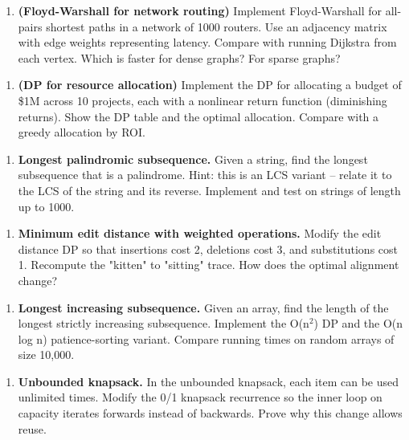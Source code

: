 \begin{enumerate}
\item \textbf{(Floyd-Warshall for network routing)} Implement Floyd-Warshall for all-pairs shortest paths in a network of 1000 routers. Use an adjacency matrix with edge weights representing latency. Compare with running Dijkstra from each vertex. Which is faster for dense graphs? For sparse graphs?
\end{enumerate}

\begin{enumerate}
\item \textbf{(DP for resource allocation)} Implement the DP for allocating a budget of \$1M across 10 projects, each with a nonlinear return function (diminishing returns). Show the DP table and the optimal allocation. Compare with a greedy allocation by ROI.
\end{enumerate}

\begin{enumerate}
\item \textbf{Longest palindromic subsequence.} Given a string, find the longest subsequence that is a palindrome. Hint: this is an LCS variant -- relate it to the LCS of the string and its reverse. Implement and test on strings of length up to 1000.
\end{enumerate}

\begin{enumerate}
\item \textbf{Minimum edit distance with weighted operations.} Modify the edit distance DP so that insertions cost 2, deletions cost 3, and substitutions cost 1. Recompute the "kitten" to "sitting" trace. How does the optimal alignment change?
\end{enumerate}

\begin{enumerate}
\item \textbf{Longest increasing subsequence.} Given an array, find the length of the longest strictly increasing subsequence. Implement the O(n$^{2}$) DP and the O(n log n) patience-sorting variant. Compare running times on random arrays of size 10,000.
\end{enumerate}

\begin{enumerate}
\item \textbf{Unbounded knapsack.} In the unbounded knapsack, each item can be used unlimited times. Modify the 0/1 knapsack recurrence so the inner loop on capacity iterates forwards instead of backwards. Prove why this change allows reuse.
\end{enumerate}

